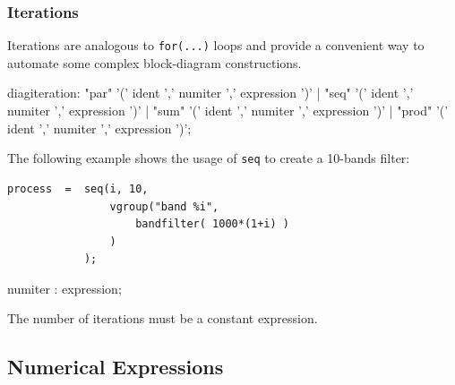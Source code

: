 \documentclass[a4paper,10pt]{book}
\begin{document}

 
\subsubsection{Iterations} 
Iterations are analogous to \lstinline'for(...)' loops and provide a convenient way to automate some complex block-diagram constructions. 


\begin{rail}
diagiteration: "par" '(' ident ',' numiter ',' expression ')'
           | "seq" '(' ident ',' numiter ',' expression ')'
           | "sum" '(' ident ',' numiter ',' expression ')'
           | "prod" '(' ident ',' numiter ',' expression ')';
\end{rail}

The following example shows the usage of  \lstinline'seq' to create a 10-bands filter:

\begin{lstlisting}
process  =	seq(i, 10, 
				vgroup("band %i", 
					bandfilter( 1000*(1+i) ) 
				) 
			);
\end{lstlisting}


           
\begin{rail}
numiter : expression;
\end{rail}
The number of iterations must be a constant expression. 


\subsection{Numerical Expressions}
\end{document}
